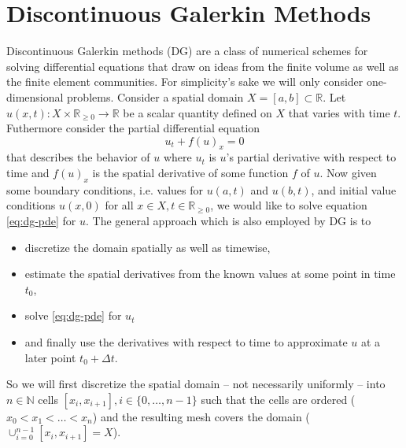 \section{Discontinuous Galerkin Methods}
\label{sec:dg}

Discontinuous Galerkin methods (DG) are a class of numerical schemes for solving differential equations that draw on ideas from the finite volume as well as the finite element communities.
For simplicity's sake we will only consider one-dimensional problems.
Consider a spatial domain $X = [a, b] \subset \mathbb{R}$.
Let $u(x, t) : X \times \mathbb{R}_{\ge 0} \rightarrow \mathbb{R}$ be a scalar quantity defined on $X$ that varies with time $t$.
Futhermore consider the partial differential equation
\begin{equation}
  \label{eq:dg-pde}
  u_{t} + f(u)_{x} = 0
\end{equation}
that describes the behavior of $u$ where $u_{t}$ is $u$'s partial derivative with respect to time and $f(u)_{x}$ is the spatial derivative of some function $f$ of $u$.
Now given some boundary conditions, i.e. values for $u(a, t)$ and $u(b, t)$, and initial value conditions $u(x, 0)$ for all $x \in X, t \in \mathbb{R}_{\ge 0}$, we would like to solve equation \eqref{eq:dg-pde} for $u$.
The general approach which is also employed by DG is to
\begin{itemize}
\item discretize the domain spatially as well as timewise,
\item estimate the spatial derivatives from the known values at some point in time $t_{0}$,
\item solve \eqref{eq:dg-pde} for $u_{t}$
\item and finally use the derivatives with respect to time to approximate $u$ at a later point $t_{0} + \Delta t$.
\end{itemize}
So we will first discretize the spatial domain -- not necessarily uniformly -- into $n \in \mathbb{N}$ cells $[x_{i}, x_{i + 1}], i \in \{ 0, \dots, n - 1 \}$ such that the cells are ordered ($x_{0} < x_{1} < \dots < x_{n}$) and the resulting mesh covers the domain ($\cup_{i = 0}^{n - 1} [x_{i}, x_{i + 1}] = X$).

